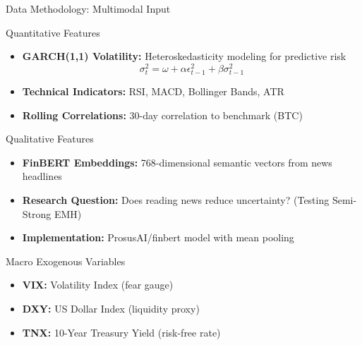 \documentclass[aspectratio=169]{beamer}
\begin{document}
\begin{frame}{Data Methodology: Multimodal Input}
\begin{block}{Quantitative Features}
\begin{itemize}
    \item \textbf{GARCH(1,1) Volatility:} Heteroskedasticity modeling for predictive risk
    \begin{equation*}
        \sigma_t^2 = \omega + \alpha \epsilon_{t-1}^2 + \beta \sigma_{t-1}^2
    \end{equation*}
    \item \textbf{Technical Indicators:} RSI, MACD, Bollinger Bands, ATR
    \item \textbf{Rolling Correlations:} 30-day correlation to benchmark (BTC)
\end{itemize}
\end{block}

\vspace{0.3cm}

\begin{block}{Qualitative Features}
\begin{itemize}
    \item \textbf{FinBERT Embeddings:} 768-dimensional semantic vectors from news headlines
    \item \textbf{Research Question:} Does reading news reduce uncertainty? (Testing Semi-Strong EMH)
    \item \textbf{Implementation:} ProsusAI/finbert model with mean pooling
\end{itemize}
\end{block}

\vspace{0.3cm}

\begin{block}{Macro Exogenous Variables}
\begin{itemize}
    \item \textbf{VIX:} Volatility Index (fear gauge)
    \item \textbf{DXY:} US Dollar Index (liquidity proxy)
    \item \textbf{TNX:} 10-Year Treasury Yield (risk-free rate)
\end{itemize}
\end{block}
\end{frame}
\end{document}

